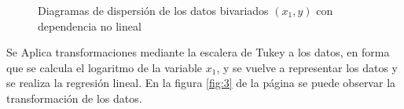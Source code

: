 \documentclass{article}
\begin{document}
\begin{figure}
\centering
{}
\label{fig:a}
\centering
{}
\label{fig:b}
\centering
\caption{Diagramas de dispersión de los datos bivariados $(x_1 , y)$ con dependencia no lineal}
\label{fig:2} 
\end{figure}

Se Aplica transformaciones mediante la escalera de Tukey a los datos, en forma que se calcula el logaritmo de la variable $x_{1}$, y se vuelve a representar los datos y se realiza la regresión lineal. En la figura \ref{fig:3} de la página \pageref{fig:3} se puede observar la transformación de los datos.
\end{document}
